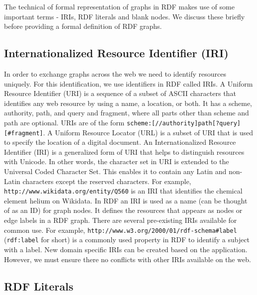 The technical of formal representation of graphs in RDF makes use of some important terms - IRIs, RDF literals and blank nodes. We discuss these briefly before providing a formal definition of RDF graphs.

\subsection{Internationalized Resource Identifier (IRI)}

In order to exchange graphs across the web we need to identify resources uniquely. For this identification, we use identifiers in RDF called IRIs. 
A Uniform Resource Identifier (URI) is a sequence of a subset of ASCII characters that identifies any web resource by using a name, a location, or both. It has a scheme, authority, path, and query and fragment, where all parts other than scheme and path are optional. URIs are of the form \texttt{scheme:[//authority]path[?query][\#fragment]}. A Uniform Resource Locator (URL) is a subset of URI that is used to specify the location of a digital document.
An Internationalized Resource Identifier (IRI) is a generalized form of URI that helps to distinguish resources with Unicode. In other words, the character set in URI is extended to the Universal Coded Character Set. This enables it to contain any Latin and non-Latin characters except the reserved characters. For example, \texttt{http://www.wikidata.org/entity/Q560} is an IRI that identifies the chemical element helium on Wikidata. 
In RDF an IRI is used as a name (can be thought of as an ID) for graph nodes. It defines the resources that appears as nodes or edge labels in a RDF graph. There are several pre-existing IRIs available for common use. For example, \texttt{http://www.w3.org/2000/01/rdf-schema\#label} (\texttt{rdf:label} for short) is a commonly used property in RDF to identify a subject with a label. New domain specific IRIs can be created based on the application. However, we must ensure there no conflicts with other IRIs available on the web.

\subsection{RDF Literals}
\label{subsec:rdf-literals}

